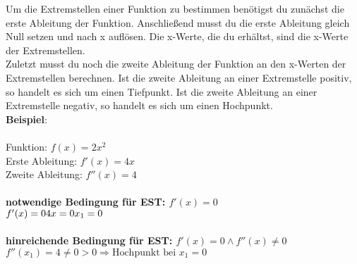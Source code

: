 \documentclass[25pt, a3paper, portrait]{tikzposter}
\begin{document}
    \begin{columns}
        {
            Um die Extremstellen einer Funktion zu bestimmen benötigst du zunächst die erste Ableitung der Funktion.
        Anschließend musst du die erste Ableitung gleich Null setzen und nach x auflösen.
        Die x-Werte, die du erhältst, sind die x-Werte der Extremstellen. \\
        Zuletzt musst du noch die zweite Ableitung der Funktion an den x-Werten der Extremstellen berechnen.
        Ist die zweite Ableitung an einer Extremstelle positiv, so handelt es sich um einen Tiefpunkt.
        Ist die zweite Ableitung an einer Extremstelle negativ, so handelt es sich um einen Hochpunkt. \\
        \textbf{Beispiel}: \\\\
        Funktion: $f(x) = 2x^2$\\
        Erste Ableitung: $f'(x) = 4x$\\
        Zweite Ableitung: $f''(x) = 4$\\\\
        \textbf{notwendige Bedingung für EST: $f'(x) = 0$}\\
        $
        f'(x) = 0 \\
        4x = 0 \\
        x_1 = 0
        $
        \\\\
        \textbf{hinreichende Bedingung für EST: $f'(x) = 0 \land f''(x) \ne 0$}\\
        $
        f''(x_1) = 4 \ne 0 > 0 \Rightarrow \text{Hochpunkt bei } x_1 = 0
        $
        }


\end{columns}
\end{document}
